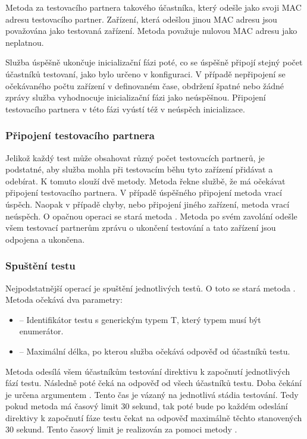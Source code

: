 Metoda  za testovacího partnera takového účastníka, který odešle jako svoji MAC adresu testovacího partner. Zařízení, která odešlou jinou MAC adresu jsou považována jako testovaná zařízení. Metoda považuje nulovou MAC adresu jako neplatnou.

Služba úspěšně ukončuje inicializační fázi poté, co se úspěšně připojí stejný počet účastníků testovaní, jako bylo určeno v konfiguraci. V případě nepřipojení se očekávaného počtu zařízení v definovaném čase, obdržení špatné nebo žádné zprávy služba vyhodnocuje inicializační fázi jako neúspěšnou. Připojení testovacího partnera v této fázi vyústí též v neúspěch inicializace. 

\subsubsection{Připojení testovacího partnera}

Jelikož každý test může obsahovat různý počet testovacích partnerů, je podstatné, aby služba mohla při testovacím běhu tyto zařízení přidávat a odebírat. K tomuto slouží dvě metody. Metoda  řekne službě, že má očekávat připojení testovacího partnera. V případě úspěšného připojení metoda vrací úspěch. Naopak v případě chyby, nebo připojení jiného zařízení, metoda vrací neúspěch. O opačnou operaci se stará metoda . Metoda po svém zavolání odešle všem testovací partnerům zprávu o ukončení testování a tato zařízení jsou odpojena a ukončena.

\subsubsection{Spuštění testu}

Nejpodstatnější operací je spuštění jednotlivých testů. O toto se stará metoda . Metoda očekává dva parametry:

\begin{itemize}
    \item {} -- Identifikátor testu s generickým typem T, který typem musí být enumerátor.
    \item {} -- Maximální délka, po kterou služba očekává odpověď od účastníků testu. 
\end{itemize}

Metoda odesílá všem účastníkům testování direktivu k započnutí jednotlivých fází testu. Následně poté čeká na odpověď od všech účastníků testu. Doba čekání je určena argumentem . Tento čas je vázaný na jednotlivá stádia testování. Tedy pokud metoda má časový limit 30 sekund, tak poté bude po každém odeslání direktivy k započnutí fáze testu čekat na odpověď maximálně těchto stanovených 30 sekund. Tento časový limit je realizován za pomoci metody .

